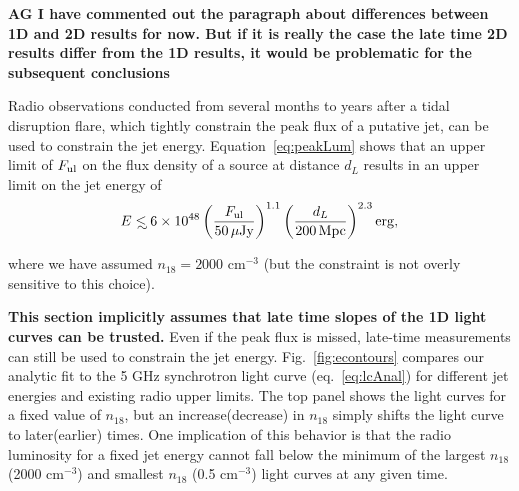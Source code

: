 \documentclass[usenatbib,fleqn]{mnras}
\newcommand\lsim{\mathrel{\rlap{\lower4pt\hbox{\hskip1pt$\sim$}}
    \raise1pt\hbox{$<$}}}
\begin{document}
{\bf AG I have commented out the paragraph about differences between
  1D and 2D results for now. But if it is really the case the late
  time 2D results differ from the 1D results, it would be problematic
  for the subsequent conclusions}

Radio observations conducted from several months to years after a
tidal disruption flare, which tightly constrain the peak flux of a
putative jet, can be used to constrain the jet energy.
Equation~\eqref{eq:peakLum} shows that an upper limit of $F_{\rm ul}$
on the flux density of a source at distance $d_L$ results in an upper
limit on the jet energy of
\begin{equation}
E\lsim 6 \times 10^{48} \left(\frac{F_{\rm ul}}{50 \,\mu{\rm Jy}}\right)^{1.1}
  \left(\frac{d_L}{200 \,{\rm Mpc}}\right)^{2.3} {\rm erg},
\end{equation}

where we have assumed $n_{18}=2000$ cm$^{-3}$ (but the constraint is not
overly sensitive to this choice). 

{\bf This section implicitly assumes that late time slopes of the 1D
  light curves can be trusted.}  Even if the peak flux is missed,
late-time measurements can still be used to constrain the jet energy.
Fig.~\ref{fig:econtours} compares our analytic fit to the 5 GHz
synchrotron light curve (eq.~\ref{eq:lcAnal}) for different jet
energies and existing radio upper limits.  The top panel shows the
light curves for a fixed value of $n_{18}$, but an increase(decrease)
in $n_{18}$ simply shifts the light curve to later(earlier) times.
One implication of this behavior is that the radio luminosity for a
fixed jet energy cannot fall below the minimum of the largest $n_{18}$
(2000 cm$^{-3}$) and smallest $n_{18}$ (0.5 cm$^{-3}$) light curves at
any given time.
\end{document}
